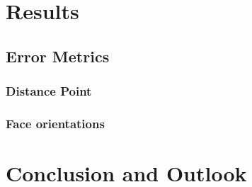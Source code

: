 \chapter{Results}

\section{Error Metrics}

\subsection{Distance Point}
\subsection{Face orientations}

\chapter{Conclusion and Outlook}
